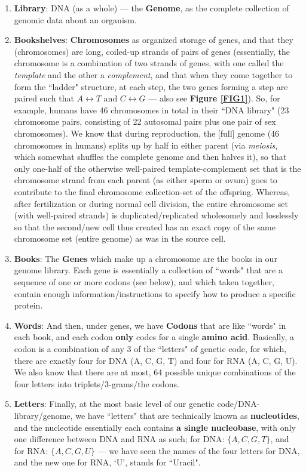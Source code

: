 \documentclass[a4paper, 18pt]{article} %
\begin{document}
\begin{enumerate}
\item \textbf{Library}: DNA (as a whole) --- the \textbf{Genome},	 as the complete collection of genomic data about an organism.
\item \textbf{Bookshelves}: \textbf{Chromosomes} as organized storage of genes, and that they (chromosomes) are long, coiled-up strands of pairs of genes (essentially, the chromosome is a combination of two strands of genes, with one called the \textit{template} and the other a \textit{complement}, and that when they come together to form the ``ladder" structure, at each step, the two genes forming a step are paired such that $A \leftrightarrow T$ and $C \leftrightarrow G$ \cite{passel_dna_structure} --- also see \textbf{Figure \ref{FIG1}}). So, for example, humans have 46 chromosomes in total in their ``DNA library" (23 chromosome pairs, consisting of 22 autosomal pairs plus one pair of sex chromosomes). We know that during reproduction, the [full] genome (46 chromosomes in humans) splits up by half in either parent (via \textit{meiosis}, which somewhat shuffles the complete genome and then halves it\cite{genomics2025origin}), so that only one-half of the otherwise well-paired template-complement set that is the chromosome strand from each parent (as either sperm or ovum) goes to contribute to the final chromosome collection-set of the offspring\cite{libretexts2025gametogenesis}\cite{gregory1987oxford}. Whereas, after fertilization or during normal cell division, the entire chromosome set (with well-paired strands) is duplicated/replicated wholesomely and losslessly so that the second/new cell thus created has an exact copy of the same chromosome set (entire genome) as was in the source cell\cite{leicester_cellcycle}. 
\item \textbf{Books}: The \textbf{Genes} which make up a chromosome are the books in our genome library. Each gene is essentially a collection of ``words" that are a sequence of one or more codons (see below), and which taken together, contain enough information/instructions to specify how to produce a specific protein\cite{gregory1987oxford}\cite{venville2006analogies}.
\item \textbf{Words}: And then, under genes, we have \textbf{Codons} that are like ``words" in each book, and each codon \textbf{only} codes for a single \textbf{amino acid}. Basically, a codon is a combination of any 3 of the ``letters" of genetic code, for which, there are exactly four for DNA (A, C, G, T) and four for RNA (A, C, G, U). We also know that there are at most, 64 possible unique combinations of the four letters into triplets/3-grams/the codons\cite{gregory1987oxford}.
\item \textbf{Letters}: Finally, at the most basic level of our genetic code/DNA-library/genome, we have ``letters" that are technically known as \textbf{nucleotides}, and the nucleotide essentially each contains \textbf{a single nucleobase}, with only one difference between DNA and RNA as such; for DNA: $\{A, C, G, T\}$, and for RNA: $\{A, C, G, U\}$ --- we have seen the names of the four letters for DNA, and the new one for RNA, `U', stands for ``Uracil".
\end{enumerate}
\end{document}
